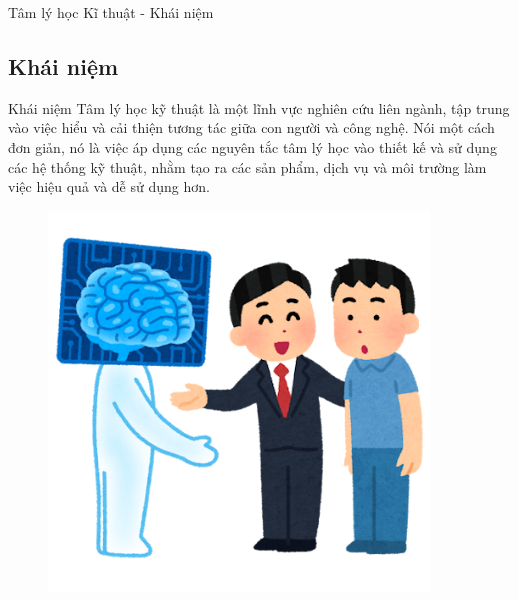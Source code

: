 \documentclass[../main.tex]{subfiles}
\begin{document}
\begin{frame}{Tâm lý học Kĩ thuật - Khái niệm}

\subsection{Khái niệm}
\begin{minipage}{0.45\textwidth}
		\begin{block}{Khái niệm}
            Tâm lý học kỹ thuật là một lĩnh vực nghiên cứu liên ngành, tập trung vào việc hiểu và cải thiện tương tác giữa con người và công nghệ. Nói một cách đơn giản, nó là việc áp dụng các nguyên tắc tâm lý học vào thiết kế và sử dụng các hệ thống kỹ thuật, nhằm tạo ra các sản phẩm, dịch vụ và môi trường làm việc hiệu quả và dễ sử dụng hơn.
        \end{block}
\end{minipage}\hfill
\begin{minipage}{0.45\textwidth}
		\begin{figure}[H]
		\centering
		\includegraphics[width=0.9\textwidth]{anh/ai_man.png}
		\end{figure}
\end{minipage}



\end{frame}
\end{document}
